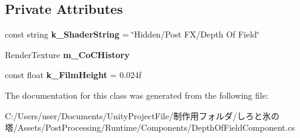 \subsection*{Private Attributes}
\begin{DoxyCompactItemize}
\item 
\mbox{\label{class_unity_engine_1_1_post_processing_1_1_depth_of_field_component_a8ec9a0cf015ec97ea56c75049e792a27}} 
const string {\bfseries k\+\_\+\+Shader\+String} = \char`\"{}Hidden/Post FX/Depth Of Field\char`\"{}
\item 
\mbox{\label{class_unity_engine_1_1_post_processing_1_1_depth_of_field_component_ad7786f081d1bde9d1d215acc36cab1e8}} 
Render\+Texture {\bfseries m\+\_\+\+Co\+C\+History}
\item 
\mbox{\label{class_unity_engine_1_1_post_processing_1_1_depth_of_field_component_aa3e36fa512910028768573129c5389ce}} 
const float {\bfseries k\+\_\+\+Film\+Height} = 0.\+024f
\end{DoxyCompactItemize}


The documentation for this class was generated from the following file\+:\begin{DoxyCompactItemize}
\item 
C\+:/\+Users/user/\+Documents/\+Unity\+Project\+File/制作用フォルダ/しろと氷の塔/\+Assets/\+Post\+Processing/\+Runtime/\+Components/Depth\+Of\+Field\+Component.\+cs\end{DoxyCompactItemize}
